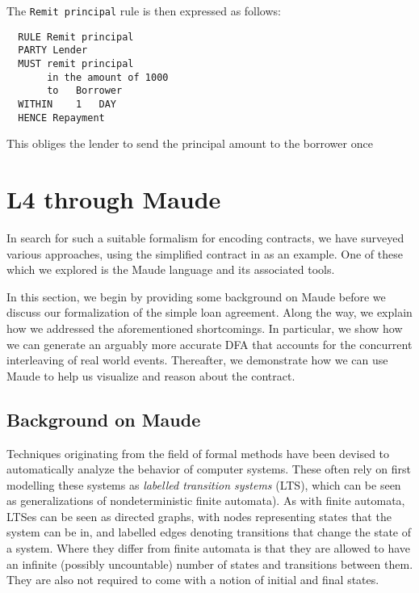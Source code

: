 \documentclass{article}
\begin{document}
The \texttt{Remit principal} rule is then expressed as follows:
\begin{lstlisting}
  RULE Remit principal		
  PARTY	Lender		
  MUST remit principal
       in the amount of 1000
       to	Borrower
  WITHIN	1	DAY
  HENCE	Repayment
\end{lstlisting}
This obliges the lender to send the principal amount to the borrower once

\section{L4 through Maude}

In search for such a suitable formalism for encoding contracts,
we have surveyed various approaches, using the simplified contract in
\cite[Fig 1.]{contract_as_automaton} as an example.
One of these which we explored is the Maude language and its associated tools.

In this section, we begin by providing some background on Maude before
we discuss our formalization of the simple loan agreement.
Along the way, we explain how we addressed the aforementioned shortcomings.
In particular, we show how we can generate an arguably more accurate DFA that
accounts for the concurrent interleaving of real world events.
Thereafter, we demonstrate how we can use Maude to help us
visualize and reason about the contract.

\subsection{Background on Maude}
Techniques originating from the field of formal methods have been devised to
automatically analyze the behavior of computer systems.
These often rely on first modelling these systems as
\textit{labelled transition systems} (LTS), which can be seen as
generalizations of nondeterministic finite automata).
As with finite automata, LTSes can be seen as directed graphs, with nodes
representing states that the system can be in, and labelled edges denoting
transitions that change the state of a system.
Where they differ from finite automata is that they are allowed to have an
infinite (possibly uncountable) number of states and transitions
between them.
They are also not required to come with a notion of initial and final states.
\end{document}
